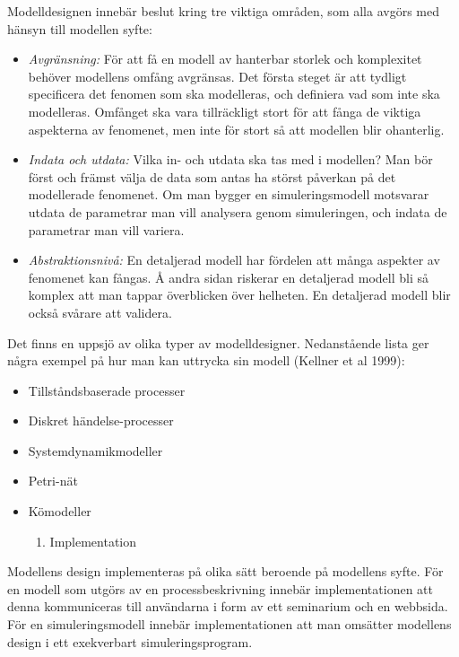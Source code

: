 Modelldesignen innebär beslut kring tre viktiga områden, som alla avgörs
med hänsyn till modellen syfte:

\begin{itemize}
\item
  \emph{Avgränsning:} För att få en modell av hanterbar storlek och
  komplexitet behöver modellens omfång avgränsas. Det första steget är
  att tydligt specificera det fenomen som ska modelleras, och definiera
  vad som inte ska modelleras. Omfånget ska vara tillräckligt stort för
  att fånga de viktiga aspekterna av fenomenet, men inte för stort så
  att modellen blir ohanterlig.
\item
  \emph{Indata och utdata:} Vilka in- och utdata ska tas med i modellen?
  Man bör först och främst välja de data som antas ha störst påverkan på
  det modellerade fenomenet. Om man bygger en simuleringsmodell
  motsvarar utdata de parametrar man vill analysera genom simuleringen,
  och indata de parametrar man vill variera.
\item
  \emph{Abstraktionsnivå:} En detaljerad modell har fördelen att många
  aspekter av fenomenet kan fångas. Å andra sidan riskerar en detaljerad
  modell bli så komplex att man tappar överblicken över helheten. En
  detaljerad modell blir också svårare att validera.
\end{itemize}

Det finns en uppsjö av olika typer av modelldesigner. Nedanstående lista
ger några exempel på hur man kan uttrycka sin modell (Kellner et al
1999):

\begin{itemize}
\item
  Tillståndsbaserade processer
\item
  Diskret händelse-processer
\item
  Systemdynamikmodeller
\item
  Petri-nät
\item
  Kömodeller

  \begin{enumerate}
  \def\labelenumi{\arabic{enumi}.}
  \item
    Implementation
  \end{enumerate}
\end{itemize}

Modellens design implementeras på olika sätt beroende på modellens
syfte. För en modell som utgörs av en processbeskrivning innebär
implementationen att denna kommuniceras till användarna i form av ett
seminarium och en webbsida. För en simuleringsmodell innebär
implementationen att man omsätter modellens design i ett exekverbart
simuleringsprogram.

